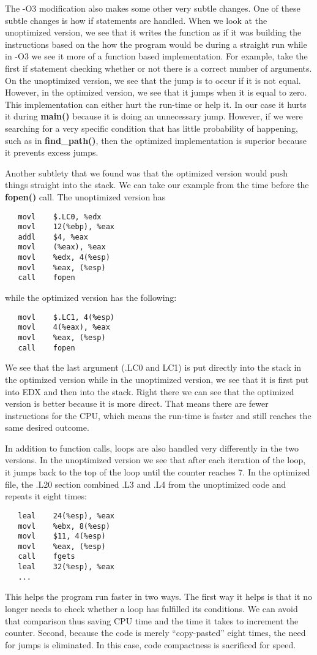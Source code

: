 \documentclass[12pt,letterpaper]{article}
\begin{document}
The -O3 modification also makes some other very subtle changes. One of 
these subtle changes is how if statements are handled. When we look 
at the unoptimized version, we see that it writes the function as if 
it was building the instructions based on the how the program would be 
during a straight run while in -O3 we see it more of a function based 
implementation. For example, take the first if statement checking 
whether or not there is a correct number of arguments. On the 
unoptimized version, we see that the jump is to occur if it is 
not equal. However, in the optimized version, we see that it jumps when 
it is equal to zero. This implementation can either hurt the run-time 
or help it. In our case it hurts it during {\bf main()} because it is 
doing an unnecessary jump. However, if we were searching for a very 
specific condition that has little probability of happening, such as
in {\bf find\_path()}, then the optimized 
implementation is superior because it prevents excess jumps.

Another subtlety that we found was that the optimized version would push 
things straight into the stack. We can take our example from the time 
before the {\bf fopen()} call. The unoptimized version has
\begin{verbatim}
   movl    $.LC0, %edx
   movl    12(%ebp), %eax
   addl    $4, %eax
   movl    (%eax), %eax
   movl    %edx, 4(%esp)
   movl    %eax, (%esp)
   call    fopen
\end{verbatim}
while the optimized version has the following:
\begin{verbatim}
   movl    $.LC1, 4(%esp)
   movl    4(%eax), %eax
   movl    %eax, (%esp)
   call    fopen
\end{verbatim}
We see that the last argument (.LC0 and LC1) is put directly into 
the stack in the optimized version while in the unoptimized version, 
we see that it is first put into EDX and then into the stack. Right 
there we can see that the optimized version is better because it is
more direct. That means there are fewer instructions for 
the CPU, which means the run-time is faster and still reaches the 
same desired outcome.

In addition to function calls, loops are also handled very differently 
in the two versions. In the unoptimized version we see that after each 
iteration of the loop, it jumps back to the top of the loop until the
counter reaches 7. In the optimized file, the .L20 section combined .L3 
and .L4 from the unoptimized code and repeats it eight times:
\begin{verbatim}
   leal    24(%esp), %eax
   movl    %ebx, 8(%esp)
   movl    $11, 4(%esp)
   movl    %eax, (%esp)
   call    fgets
   leal    32(%esp), %eax
   ...
\end{verbatim} 
This helps the program run faster in two ways. The first way it helps is 
that it no longer needs to check whether a loop has 
fulfilled its conditions. We can avoid that comparison thus saving 
CPU time and the time it takes to increment the counter. Second, 
because the code is merely ``copy-pasted'' eight times, the need for
jumps is eliminated. In this case, code compactness is sacrificed for speed.
   
\end{document}
